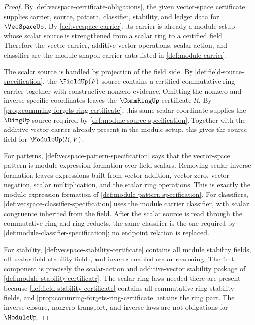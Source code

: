 \begin{proof}
By \autoref{def:vecspace-certificate-obligations}, the given vector-space certificate supplies carrier, source, pattern, classifier, stability, and ledger data for $\VecSpaceUp$. By \autoref{def:vecspace-carrier}, its carrier is already a module setup whose scalar source is strengthened from a scalar ring to a certified field. Therefore the vector carrier, additive vector operations, scalar action, and classifier are the module-shaped carrier data listed in \autoref{def:module-carrier}.

The scalar source is handled by projection of the field side. By \autoref{def:field-source-specification}, the $\FieldUp(F)$ source contains a certified commutative-ring carrier together with constructive nonzero evidence. Omitting the nonzero and inverse-specific coordinates leaves the $\CommRingUp$ certificate $R$. By \autoref{prop:commring-forgets-ring-certificate}, this same scalar coordinate supplies the $\RingUp$ source required by \autoref{def:module-source-specification}. Together with the additive vector carrier already present in the module setup, this gives the source field for $\ModuleUp(R,V)$.

For patterns, \autoref{def:vecspace-pattern-specification} says that the vector-space pattern is module expression formation over field scalars. Removing scalar inverse formation leaves expressions built from vector addition, vector zero, vector negation, scalar multiplication, and the scalar ring operations. This is exactly the module expression formation of \autoref{def:module-pattern-specification}. For classifiers, \autoref{def:vecspace-classifier-specification} uses the module carrier classifier, with scalar congruence inherited from the field. After the scalar source is read through the commutative-ring and ring reducts, the same classifier is the one required by \autoref{def:module-classifier-specification}; no endpoint relation is replaced.

For stability, \autoref{def:vecspace-stability-certificate} contains all module stability fields, all scalar field stability fields, and inverse-enabled scalar reasoning. The first component is precisely the scalar-action and additive-vector stability package of \autoref{def:module-stability-certificate}. The scalar ring laws needed there are present because \autoref{def:field-stability-certificate} contains all commutative-ring stability fields, and \autoref{prop:commring-forgets-ring-certificate} retains the ring part. The inverse closure, nonzero transport, and inverse laws are not obligations for $\ModuleUp$.


\end{proof}

